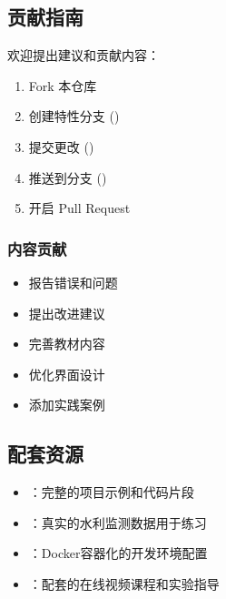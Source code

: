 \hypertarget{ux8d21ux732eux6307ux5357}{%
\subsection{贡献指南}\label{ux8d21ux732eux6307ux5357}}

欢迎提出建议和贡献内容：

\begin{enumerate}
\def\labelenumi{\arabic{enumi}.}
\tightlist
\item
  Fork 本仓库
\item
  创建特性分支 ()
\item
  提交更改 ()
\item
  推送到分支 ()
\item
  开启 Pull Request
\end{enumerate}

\hypertarget{ux5185ux5bb9ux8d21ux732e}{%
\subsubsection{内容贡献}\label{ux5185ux5bb9ux8d21ux732e}}

\begin{itemize}
\tightlist
\item
  报告错误和问题
\item
  \faLightbulb 提出改进建议
\item
  \faEdit 完善教材内容
\item
  优化界面设计
\item
  添加实践案例
\end{itemize}

\hypertarget{ux914dux5957ux8d44ux6e90}{%
\subsection{配套资源}\label{ux914dux5957ux8d44ux6e90}}

\begin{itemize}
\tightlist
\item
  ：完整的项目示例和代码片段
\item
  ：真实的水利监测数据用于练习
\item
  ：Docker容器化的开发环境配置
\item
  ：配套的在线视频课程和实验指导
\end{itemize}

